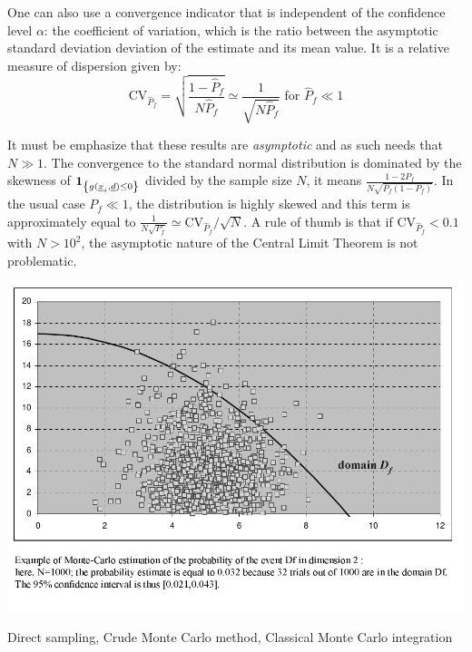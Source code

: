 {  One can also use a convergence indicator that is independent of the confidence level $\alpha$: the coefficient of variation, which is the ratio between the asymptotic standard deviation deviation of the estimate and its mean value. It is a relative measure of dispersion given by:
  $$
  \textrm{CV}_{\widehat{P}_f}=\sqrt{ \frac{1-\widehat{P}_f}{N \widehat{P}_f}}\simeq\frac{1}{\sqrt{N\widehat{P}_f}}\mbox{ for }\widehat{P}_f\ll 1
  $$


  It must be emphasize that these results are \emph{asymptotic} and as such needs that $N\gg 1$. The convergence to the standard normal distribution is dominated by the skewness of $\mathbf{1}_{ \left\{ g({\underline{x}}_i,{\underline{d}}) \leq 0 \right\} }$ divided by the sample size $N$, it means $\frac{1-2P_f}{N\sqrt{P_f(1-P_f)}}$. In the usual case $P_f\ll 1$, the distribution is highly skewed and this term is approximately equal to $\frac{1}{N\sqrt{P_f}}\simeq\textrm{CV}_{\widehat{P}_f}/\sqrt{N}$. A rule of thumb is that if $\textrm{CV}_{\widehat{P}_f}<0.1$ with $N>10^2$, the asymptotic nature of the Central Limit Theorem is not problematic.

  \begin{center}
    \includegraphics[scale=0.8]{MC2.pdf}
  \end{center}
}
{
  Direct sampling, Crude Monte Carlo method, Classical Monte Carlo integration
}

